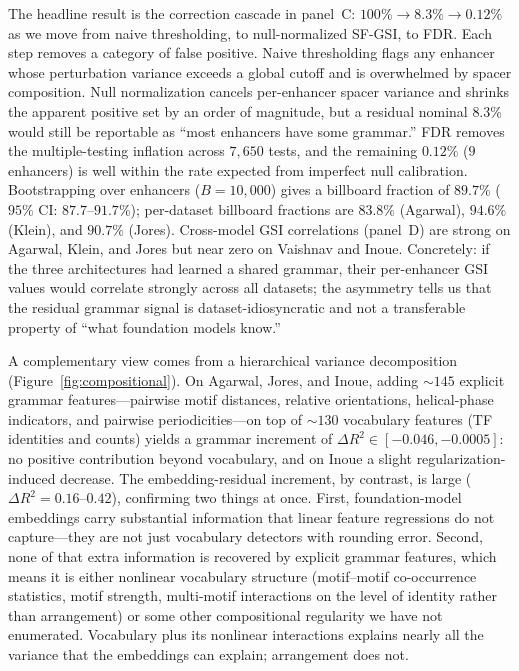 \documentclass{article}
\begin{document}
The headline result is the correction cascade in panel~C: $100\% \to 8.3\% \to 0.12\%$ as we move from naive thresholding, to null-normalized SF-GSI, to FDR. Each step removes a category of false positive. Naive thresholding flags any enhancer whose perturbation variance exceeds a global cutoff and is overwhelmed by spacer composition. Null normalization cancels per-enhancer spacer variance and shrinks the apparent positive set by an order of magnitude, but a residual nominal $8.3\%$ would still be reportable as ``most enhancers have some grammar.'' FDR removes the multiple-testing inflation across $7{,}650$ tests, and the remaining $0.12\%$ ($9$ enhancers) is well within the rate expected from imperfect null calibration. Bootstrapping over enhancers ($B = 10{,}000$) gives a billboard fraction of $89.7\%$ ($95\%$ CI: $87.7$--$91.7\%$); per-dataset billboard fractions are $83.8\%$ (Agarwal), $94.6\%$ (Klein), and $90.7\%$ (Jores). Cross-model GSI correlations (panel~D) are strong on Agarwal, Klein, and Jores but near zero on Vaishnav and Inoue. Concretely: if the three architectures had learned a shared grammar, their per-enhancer GSI values would correlate strongly across all datasets; the asymmetry tells us that the residual grammar signal is dataset-idiosyncratic and not a transferable property of ``what foundation models know.''

A complementary view comes from a hierarchical variance decomposition (Figure~\ref{fig:compositional}). On Agarwal, Jores, and Inoue, adding $\sim\!145$ explicit grammar features---pairwise motif distances, relative orientations, helical-phase indicators, and pairwise periodicities---on top of $\sim\!130$ vocabulary features (TF identities and counts) yields a grammar increment of $\Delta R^2 \in [-0.046, -0.0005]$: no positive contribution beyond vocabulary, and on Inoue a slight regularization-induced decrease. The embedding-residual increment, by contrast, is large ($\Delta R^2 = 0.16$--$0.42$), confirming two things at once. First, foundation-model embeddings carry substantial information that linear feature regressions do not capture---they are not just vocabulary detectors with rounding error. Second, none of that extra information is recovered by explicit grammar features, which means it is either nonlinear vocabulary structure (motif--motif co-occurrence statistics, motif strength, multi-motif interactions on the level of identity rather than arrangement) or some other compositional regularity we have not enumerated. Vocabulary plus its nonlinear interactions explains nearly all the variance that the embeddings can explain; arrangement does not.
\end{document}
